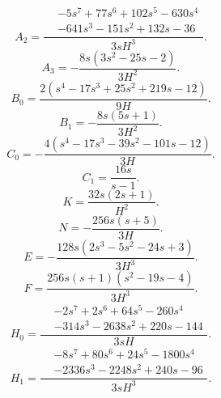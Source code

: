 \begin{equation}
A_2=\frac{\begin{aligned}&- 5 s^{7} + 77 s^{6} + 102 s^{5} - 630 s^{4}\\&- 641 s^{3} - 151 s^{2} + 132 s - 36\end{aligned}}{3 s H^{3}}.
\end{equation}
\begin{equation}
A_3=- \frac{8 s \left(3 s^{2} - 25 s - 2\right)}{3 H^{2}}.
\end{equation}
\begin{equation}
B_0=\frac{2 \left(s^{4} - 17 s^{3} + 25 s^{2} + 219 s - 12\right)}{9 H}.
\end{equation}
\begin{equation}
B_1=- \frac{8 s \left(5 s + 1\right)}{3 H^{2}}.
\end{equation}
\begin{equation}
C_0=- \frac{4 \left(s^{4} - 17 s^{3} - 39 s^{2} - 101 s - 12\right)}{3 H}.
\end{equation}
\begin{equation}
C_1=\frac{16 s}{s - 1}.
\end{equation}
\begin{equation}
K=\frac{32 s \left(2 s + 1\right)}{H^{2}}.
\end{equation}
\begin{equation}
N=- \frac{256 s \left(s + 5\right)}{3 H}.
\end{equation}
\begin{equation}
E=- \frac{128 s \left(2 s^{3} - 5 s^{2} - 24 s + 3\right)}{3 H^{3}}.
\end{equation}
\begin{equation}
F=\frac{256 s \left(s + 1\right) \left(s^{2} - 19 s - 4\right)}{3 H^{3}}.
\end{equation}
\begin{equation}
H_0=\frac{\begin{aligned}&- 2 s^{7} + 2 s^{6} + 64 s^{5} - 260 s^{4}\\&- 314 s^{3} - 2638 s^{2} + 220 s - 144\end{aligned}}{3 s H}.
\end{equation}
\begin{equation}
H_1=\frac{\begin{aligned}&- 8 s^{7} + 80 s^{6} + 24 s^{5} - 1800 s^{4}\\&- 2336 s^{3} - 2248 s^{2} + 240 s - 96\end{aligned}}{3 s H^{3}}.
\end{equation}
